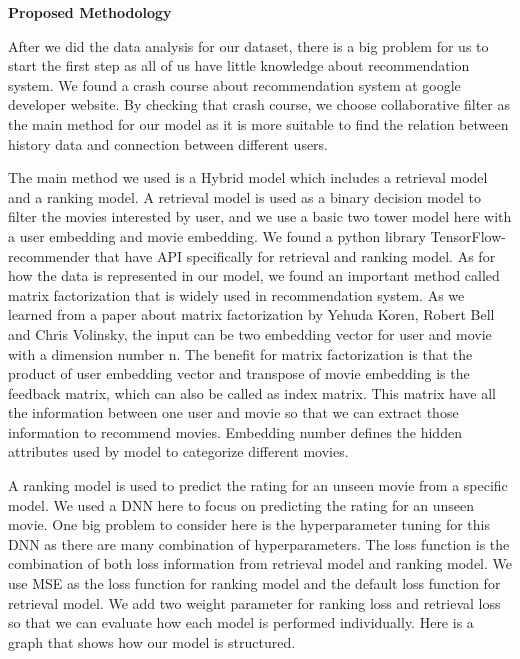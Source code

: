 \documentclass[11pt]{article}
\begin{document}
\vspace{0.5cm}

    \begin{flushleft}
        \textbf{\LARGE Proposed Methodology}
    \end{flushleft}

After we did the data analysis for our dataset, there is a big problem for us to start the first step as all of us have little knowledge about recommendation system. We found a crash course about recommendation system at google developer website. By checking that crash course, we choose collaborative filter as the main method for our model as it is more suitable to find the relation between history data and connection between different users.

\vspace{0.3cm}

The main method we used is a Hybrid model which includes a retrieval model and a ranking model. A retrieval model is used as a binary decision model to filter the movies interested by user, and we use a basic two tower model here with a user embedding and movie embedding. We found a python library TensorFlow-recommender that have API specifically for retrieval and ranking model. As for how the data is represented in our model, we found an important method called matrix factorization that is widely used in recommendation system. As we learned from a paper about matrix factorization by Yehuda Koren, Robert Bell and Chris Volinsky, the input can be two embedding vector for user and movie with a dimension number n. The benefit for matrix factorization is that the product of user embedding vector and transpose of movie embedding is the feedback matrix, which can also be called as index matrix. This matrix have all the information between one user and movie so that we can extract those information to recommend movies. Embedding number defines the hidden attributes used by model to categorize different movies.

\vspace{0.3cm}

A ranking model is used to predict the rating for an unseen movie from a specific model. We used a DNN here to focus on predicting the rating for an unseen movie. One big problem to consider here is the hyperparameter tuning for this DNN as there are many combination of hyperparameters. The loss function is the combination of both loss information from retrieval model and ranking model. We use MSE as the loss function for ranking model and the default loss function for retrieval model. We add two weight parameter for ranking loss and retrieval loss so that we can evaluate how each model is performed individually. Here is a graph that shows how our model is structured.
\end{document}
